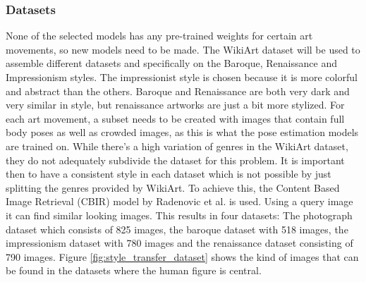 \documentclass[conference]{IEEEtran}
\begin{document}
\subsubsection{Datasets}
None of the selected models has any pre-trained weights for certain art movements, so new models need to be made.
The WikiArt dataset will be used to assemble different datasets and specifically on the Baroque, Renaissance and Impressionism styles.
The impressionist style is chosen because it is more colorful and abstract than the others.
Baroque and Renaissance are both very dark and very similar in style, but renaissance artworks are just a bit more stylized.
For each art movement, a subset needs to be created with images that contain full body poses as well as crowded images, as this is what the pose estimation models are trained on.
While there's a high variation of genres in the WikiArt dataset, they do not adequately subdivide the dataset for this problem.
It is important then to have a consistent style in each dataset which is not possible by just splitting the genres provided by WikiArt.
To achieve this, the Content Based Image Retrieval (CBIR) model by Radenovic et al. \cite{Radenovic2017} is used.
Using a query image it can find similar looking images.
This results in four datasets: The photograph dataset which consists of 825 images, the baroque dataset with 518 images, the impressionism dataset with 780 images and the renaissance dataset consisting of 790 images.
Figure \ref{fig:style_transfer_dataset} shows the kind of images that can be found in the datasets where the human figure is central.
\end{document}
